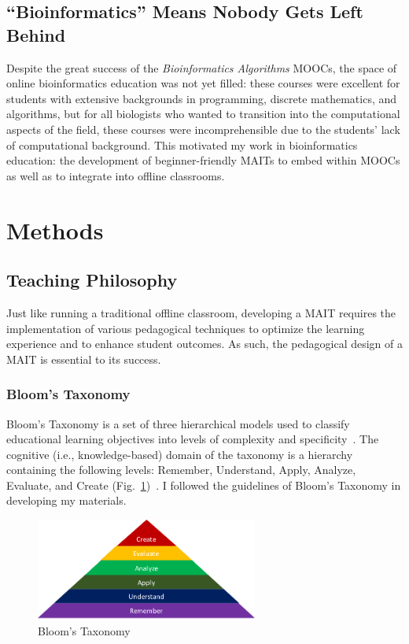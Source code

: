 \subsection{``Bioinformatics'' Means Nobody Gets Left Behind}
Despite the great success of the \textit{Bioinformatics Algorithms} \glspl{MOOC}, the space of online bioinformatics education was not yet filled: these courses were excellent for students with extensive backgrounds in programming, discrete mathematics, and algorithms, but for all biologists who wanted to transition into the computational aspects of the field, these courses were incomprehensible due to the students' lack of computational background. This motivated my work in bioinformatics education: the development of beginner-friendly \glspl{MAIT} to embed within \glspl{MOOC} as well as to integrate into offline classrooms.

\section{Methods}
\subsection{Teaching Philosophy}
Just like running a traditional offline classroom, developing a \gls{MAIT} requires the implementation of various pedagogical techniques to optimize the learning experience and to enhance student outcomes. As such, the pedagogical design of a \gls{MAIT} is essential to its success.

\subsubsection{Bloom's Taxonomy}
Bloom's Taxonomy is a set of three hierarchical models used to classify educational learning objectives into levels of complexity and specificity~\cite{Bloom1956}. The cognitive (i.e., knowledge-based) domain of the taxonomy is a hierarchy containing the following levels: Remember, Understand, Apply, Analyze, Evaluate, and Create (Fig.~\ref{fig:education-bloom-taxonomy})~\cite{Anderson2001}. I followed the guidelines of Bloom's Taxonomy in developing my materials.

\begin{figure}
\centering
\includegraphics[width=0.65\textwidth]{figs/education-bloom-taxonomy}
\caption[Bloom's Taxonomy]
{Bloom's Taxonomy}
\label{fig:education-bloom-taxonomy}
\end{figure}

